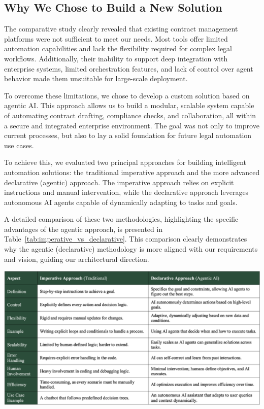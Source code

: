 \subsection{Why We Chose to Build a New Solution}
The comparative study clearly revealed that existing contract management platforms were not sufficient to meet our needs. Most tools offer limited automation capabilities and lack the flexibility required for complex legal workflows. Additionally, their inability to support deep integration with enterprise systems, limited orchestration features, and lack of control over agent behavior made them unsuitable for large-scale deployment.\mynewline

To overcome these limitations, we chose to develop a custom solution based on agentic AI. This approach allows us to build a modular, scalable system capable of automating contract drafting, compliance checks, and collaboration, all within a secure and integrated enterprise environment. The goal was not only to improve current processes, but also to lay a solid foundation for future legal automation use cases.\mynewline

To achieve this, we evaluated two principal approaches for building intelligent automation solutions: the traditional imperative approach and the more advanced declarative (agentic) approach. The imperative approach relies on explicit instructions and manual intervention, while the declarative approach leverages autonomous AI agents capable of dynamically adapting to tasks and goals.\mynewline

A detailed comparison of these two methodologies, highlighting the specific advantages of the agentic approach, is presented in Table~\ref{tab:imperative_vs_declarative}. This comparison clearly demonstrates why the agentic (declarative) methodology is more aligned with our requirements and vision, guiding our architectural direction.

\begin{center}
    \centering
    \includegraphics[width=1\textwidth]{Images/Imperative vs. Agentic Approach Comparison.png}
    \label{tab:imperative_vs_declarative}
\end{center}


